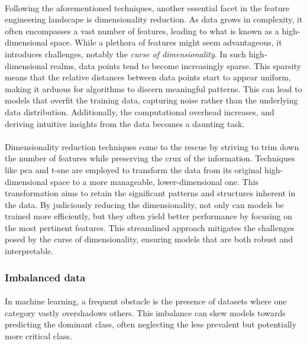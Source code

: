        \paragraph{}Following the aforementioned techniques, another essential facet in the feature engineering landscape is dimensionality reduction. As data grows in complexity, it often encompasses a vast number of features, leading to what is known as a high-dimensional space. While a plethora of features might seem advantageous, it introduces challenges, notably the \textit{curse of dimensionality}\cite{hutchison_curse_2005, koppen_curse_2000}. In such high-dimensional realms, data points tend to become increasingly sparse. This sparsity means that the relative distances between data points start to appear uniform, making it arduous for algorithms to discern meaningful patterns. This can lead to models that overfit the training data, capturing noise rather than the underlying data distribution. Additionally, the computational overhead increases, and deriving intuitive insights from the data becomes a daunting task.

        \paragraph{}Dimensionality reduction techniques come to the rescue by striving to trim down the number of features while preserving the crux of the information. Techniques like \acrfull{pca} and \acrfull{t-sne} are employed to transform the data from its original high-dimensional space to a more manageable, lower-dimensional one. This transformation aims to retain the significant patterns and structures inherent in the data. By judiciously reducing the dimensionality, not only can models be trained more efficiently, but they often yield better performance by focusing on the most pertinent features. This streamlined approach mitigates the challenges posed by the curse of dimensionality, ensuring models that are both robust and interpretable.

    \subsubsection{Imbalanced data}
        \paragraph{}In machine learning, a frequent obstacle is the presence of datasets where one category vastly overshadows others\cite{ramyachitra_imbalanced_2014}. This imbalance can skew models towards predicting the dominant class, often neglecting the less prevalent but potentially more critical class.

